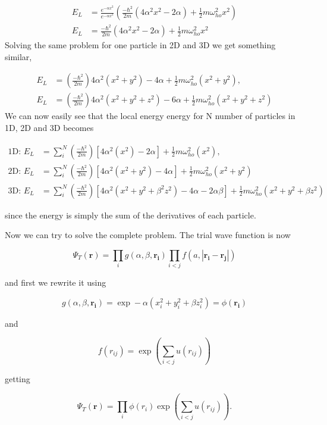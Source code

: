 \begin{align}
E_L &= \frac{e^{-\alpha x^2}}{e^{-\alpha x^2}}\left( \frac{-\hbar^2}{2m}  (4\alpha^2 x^2 - 2\alpha) + \frac{1}{2} m\omega_{ho}^2 x^2\right) \\
E_L &= \frac{-\hbar^2}{2m}(4\alpha^2 x^2 - 2\alpha) + \frac{1}{2} m\omega_{ho}^2 x^2
\end{align}
Solving the same problem for one particle in 2D and 3D we get something similar, 

\begin{align}
E_L &= (\frac{-\hbar^2}{2m})4\alpha^2 (x^2 + y^2) - 4\alpha + \frac{1}{2} m\omega_{ho}^2 (x^2 + y^2),\\
E_L &= (\frac{-\hbar^2}{2m})4\alpha^2 (x^2 + y^2 + z^2) - 6\alpha + \frac{1}{2} m\omega_{ho}^2 (x^2 + y^2 + z^2)
\end{align}
We can now easily see that the local energy energy for N number of particles in 1D, 2D and 3D becomes

\begin{equation}\label{eq:el_ni}
\begin{split}
\text{1D: }E_L &= \sum_i^N (\frac{-\hbar^2}{2m})[4\alpha^2 (x^2) - 2\alpha] + \frac{1}{2} m\omega_{ho}^2 (x^2),\\
\text{2D: }E_L &= \sum_i^N (\frac{-\hbar^2}{2m})[4\alpha^2 (x^2 + y^2) - 4\alpha] + \frac{1}{2} m\omega_{ho}^2 (x^2 + y^2)\\
\text{3D: }E_L &= \sum_i^N (\frac{-\hbar^2}{2m})[4\alpha^2 (x^2 + y^2 + \beta^2 z^2) - 4\alpha -2\alpha \beta] + \frac{1}{2} m\omega_{ho}^2 (x^2 + y^2 + \beta z^2)
\end{split}
\end{equation}

since the energy is simply the sum of the derivatives of each particle.

Now we can try to solve the complete problem. The trial wave function is now

$$\Psi_T(\mathbf{r}) = \prod_{i} g(\alpha, \beta, \mathbf{r_i}) \prod_{i<j} f(a, |\mathbf{r_i} - \mathbf{r_j}|)$$

and first we rewrite it using 

$$g(\alpha, \beta, \mathbf{r_i}) = \exp -\alpha (x_i^2 + y_i^2 + \beta z_i^2) = \phi (\mathbf{r_i})$$

and 

$$f(r_{ij}) = \exp \left(\sum_{i<j}u(r_{ij})\right)$$

getting 

$$\Psi_T(\mathbf{r}) = \prod_{i} \phi (r_i) \exp \left(\sum_{i<j}u(r_{ij})\right).$$

